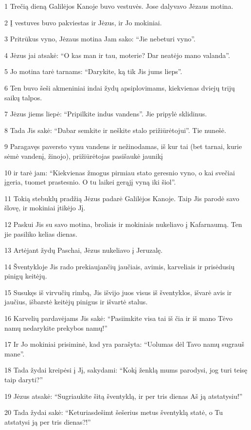 \par 1 Trečią dieną Galilėjos Kanoje buvo vestuvės. Jose dalyvavo Jėzaus motina. 
\par 2 Į vestuves buvo pakviestas ir Jėzus, ir Jo mokiniai. 
\par 3 Pritrūkus vyno, Jėzaus motina Jam sako: “Jie nebeturi vyno”. 
\par 4 Jėzus jai atsakė: “O kas man ir tau, moterie? Dar neatėjo mano valanda”. 
\par 5 Jo motina tarė tarnams: “Darykite, ką tik Jis jums lieps”. 
\par 6 Ten buvo šeši akmeniniai indai žydų apsiplovimams, kiekvienas dviejų trijų saikų talpos. 
\par 7 Jėzus jiems liepė: “Pripilkite indus vandens”. Jie pripylė sklidinus. 
\par 8 Tada Jis sakė: “Dabar semkite ir neškite stalo prižiūrėtojui”. Tie nunešė. 
\par 9 Paragavęs paversto vynu vandens ir nežinodamas, iš kur tai (bet tarnai, kurie sėmė vandenį, žinojo), prižiūrėtojas pasišaukė jaunikį 
\par 10 ir tarė jam: “Kiekvienas žmogus pirmiau stato geresnio vyno, o kai svečiai įgeria, tuomet prastesnio. O tu laikei gerąjį vyną iki šiol”. 
\par 11 Tokią stebuklų pradžią Jėzus padarė Galilėjos Kanoje. Taip Jis parodė savo šlovę, ir mokiniai įtikėjo Jį. 
\par 12 Paskui Jis su savo motina, broliais ir mokiniais nukeliavo į Kafarnaumą. Ten jie pasiliko kelias dienas. 
\par 13 Artėjant žydų Paschai, Jėzus nukeliavo į Jeruzalę. 
\par 14 Šventykloje Jis rado prekiaujančių jaučiais, avimis, karveliais ir prisėdusių pinigų keitėjų. 
\par 15 Susukęs iš virvučių rimbą, Jis išvijo juos visus iš šventyklos, išvarė avis ir jaučius, išbarstė keitėjų pinigus ir išvartė stalus. 
\par 16 Karvelių pardavėjams Jis sakė: “Pasiimkite visa tai iš čia ir iš mano Tėvo namų nedarykite prekybos namų!” 
\par 17 Ir Jo mokiniai prisiminė, kad yra parašyta: “Uolumas dėl Tavo namų sugrauš mane”. 
\par 18 Tada žydai kreipėsi į Jį, sakydami: “Kokį ženklą mums parodysi, jog turi teisę taip daryti?” 
\par 19 Jėzus atsakė: “Sugriaukite šitą šventyklą, ir per tris dienas Aš ją atstatysiu!” 
\par 20 Tada žydai sakė: “Keturiasdešimt šešerius metus šventyklą statė, o Tu atstatysi ją per tris dienas?!” 
